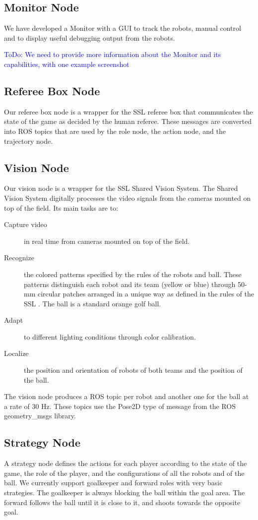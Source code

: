 \documentclass[]{llncs}
\newcommand{\TODO}[1]{{\textcolor{blue}{ToDo: {#1}}}}
\begin{document}
\subsection{Monitor Node}
We have developed a Monitor with a GUI to track the robots, manual control and to display useful debugging output from the robots. 

\TODO{We need to provide more information about the Monitor and its capabilities, with one example screenshot}


\subsection{Referee Box Node}
Our referee box node is a wrapper for the SSL referee box that communicates the state of the game as decided by
the human referee. These messages are converted into ROS topics that are used by the role node, the action node, and the trajectory node.


\subsection{Vision Node}
Our vision node is a wrapper for the SSL Shared Vision System. The Shared Vision System \cite{zlbwv-sslvtsvsftrcssl-RoboCup-2009} digitally processes the video signals from the cameras mounted on top of the field. Its main tasks are to:
\begin{description}
	\item[Capture video] in real time from cameras mounted on top of the field.
	\item[Recognize] the colored patterns specified by the rules of the robots and ball. These patterns distinguish each robot and its team (yellow or blue) through 50-mm circular patches arranged in a unique way as defined in the rules of the SSL \cite{robocup-ssl-rules}. The ball is a standard orange golf ball.
	\item[Adapt] to different lighting conditions through color calibration.
	\item[Localize] the position and orientation of robots of both teams and the position of the ball.
\end{description}

The vision node produces a ROS topic per robot and another one for the ball at a rate of 30 Hz. These topics use the Pose2D type of message from the ROS geometry\_msgs library. 


\subsection{Strategy Node}
A strategy node defines the actions for each player according to the state of the game, the role of the player, and the configurations of all the robots and of the ball. We currently support goalkeeper and forward roles with very basic strategies. The goalkeeper is always blocking the ball within the goal area. The forward follows the ball until it is close to it, and shoots towards the opposite goal.
\end{document}
